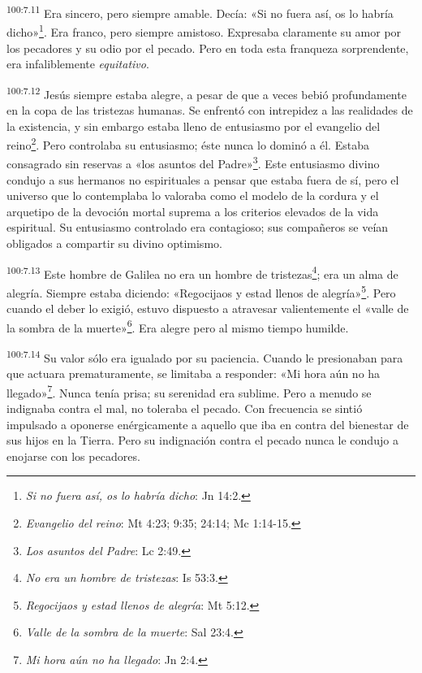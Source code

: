 \par
\textsuperscript{100:7.11} Era sincero, pero siempre amable. Decía: «Si no fuera así, os lo habría dicho»\footnote{\textit{Si no fuera así, os lo habría dicho}: Jn 14:2.}. Era franco, pero siempre amistoso. Expresaba claramente su amor por los pecadores y su odio por el pecado. Pero en toda esta franqueza sorprendente, era infaliblemente \textit{equitativo}.

\par
\textsuperscript{100:7.12} Jesús siempre estaba alegre, a pesar de que a veces bebió profundamente en la copa de las tristezas humanas. Se enfrentó con intrepidez a las realidades de la existencia, y sin embargo estaba lleno de entusiasmo por el evangelio del reino\footnote{\textit{Evangelio del reino}: Mt 4:23; 9:35; 24:14; Mc 1:14-15.}. Pero controlaba su entusiasmo; éste nunca lo dominó a él. Estaba consagrado sin reservas a «los asuntos del Padre»\footnote{\textit{Los asuntos del Padre}: Lc 2:49.}. Este entusiasmo divino condujo a sus hermanos no espirituales a pensar que estaba fuera de sí, pero el universo que lo contemplaba lo valoraba como el modelo de la cordura y el arquetipo de la devoción mortal suprema a los criterios elevados de la vida espiritual. Su entusiasmo controlado era contagioso; sus compañeros se veían obligados a compartir su divino optimismo.

\par
\textsuperscript{100:7.13} Este hombre de Galilea no era un hombre de tristezas\footnote{\textit{No era un hombre de tristezas}: Is 53:3.}; era un alma de alegría. Siempre estaba diciendo: «Regocijaos y estad llenos de alegría»\footnote{\textit{Regocijaos y estad llenos de alegría}: Mt 5:12.}. Pero cuando el deber lo exigió, estuvo dispuesto a atravesar valientemente el «valle de la sombra de la muerte»\footnote{\textit{Valle de la sombra de la muerte}: Sal 23:4.}. Era alegre pero al mismo tiempo humilde.

\par
\textsuperscript{100:7.14} Su valor sólo era igualado por su paciencia. Cuando le presionaban para que actuara prematuramente, se limitaba a responder: «Mi hora aún no ha llegado»\footnote{\textit{Mi hora aún no ha llegado}: Jn 2:4.}. Nunca tenía prisa; su serenidad era sublime. Pero a menudo se indignaba contra el mal, no toleraba el pecado. Con frecuencia se sintió impulsado a oponerse enérgicamente a aquello que iba en contra del bienestar de sus hijos en la Tierra. Pero su indignación contra el pecado nunca le condujo a enojarse con los pecadores.

